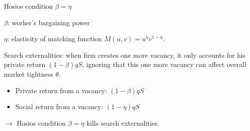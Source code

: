 \documentclass[9pt,xcolor={svgnames}]{beamer}
\begin{document}
\begin{frame}{Hosios condition $\beta=\eta$}


$\beta$: worker's bargaining power

$\eta$: elasticity of matching function $M(u, v) = u^{\eta}v^{1-\eta}$.

\vspace{4mm}


Search externalities: when firm creates one more vacancy, it only accounts for his private return $(1-\beta)qS$, ignoring that this one more vacancy can affect overall market tightness $\theta$. 

\vspace{2mm}



\begin{itemize}
    \item Private return from a vacancy: $(1-\beta) q S$

\item Social return from a vacancy: $(1-\eta)q S$
\end{itemize}


\vspace{3mm}
 $\rightarrow$ Hosios condition $\beta=\eta$ kills search externalities.
\end{frame}
\end{document}
